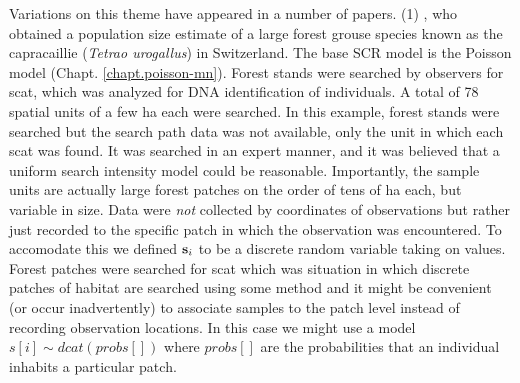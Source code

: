 Variations on this theme have appeared in a number of papers.  (1)
\citet{mollet_etal:2012}, who obtained a population size estimate of a
large forest grouse species known as the capracaillie ({\it Tetrao
  urogallus}) in Switzerland.  The base SCR model is the Poisson model
(Chapt. \ref{chapt.poisson-mn}). Forest stands were searched by
observers for scat, which was analyzed for DNA identification of
individuals.  A total of 78 spatial units of a few ha each were
searched.  In this example, forest stands were searched but the search
path data was not available, only the unit in which each scat was
found.  It was searched in an expert manner, and it was believed that
a uniform search intensity model could be reasonable.  Importantly,
the sample units are actually large forest patches on the order of
tens of ha each, but variable in size. Data were {\it not} collected
by coordinates of observations but rather just recorded to the
specific patch in which the observation was encountered. To accomodate
this we defined ${\bf s}_{i}$ to be a discrete random variable taking
on values.  Forest patches were searched for scat which was situation
in which discrete patches of habitat are searched using some method
and it might be convenient (or occur inadvertently) to associate
samples to the patch level instead of recording observation
locations. In this case we might use a model $s[i] \sim dcat(probs[])$
where $probs[]$ are the probabilities that an individual inhabits a
particular patch.

